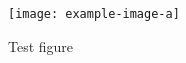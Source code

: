 \documentclass[a4paper]{article}
\begin{document}
\begin{figure}
  \texttt{[image: example-image-a]}
  \caption{Test figure}
\end{figure}
\end{document}
